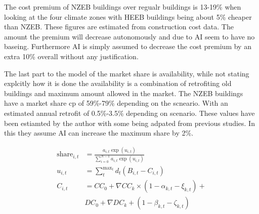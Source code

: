 \documentclass[conference,a4paper]{IEEEtran}
\begin{document}
The cost premium of NZEB buildings over regualr buildings is 13-19\% when looking at the four climate zones with HEEB buildings being about 5\% cheaper than NZEB. These figures are estimated from construction cost data. The amount the premium will decrease autonomously and due to AI seem to have no baseing. Furthermore AI is simply assumed to decrease the cost premium by an extra 10\% overall without any justification.

The last part to the model of the market share is availability, while not stating explcitly how it is done the availability is a combination of retrofiting old buildings and maximum amount allowed in the market. The NZEB buildings have a market share cp of 59\%-79\% depending on the scneario. With an estimated annual retrofit of 0.5\%-3.5\% depending on scenario. These values have been estiamted by the author with some being adpated from previous studies. In this they assume AI can increase the maximum share by 2\%.

\begin{align}
  \text{share}_{i,t} &= \frac{a_{i,t}\exp{(u_{i,t})}}{\sum_{i=0}^{N-1}a_{i,t}\exp{(u_{i,t})}}\label{eq:share} \\
  u_{i,t} &= \sum_{t}^{\text{max}_t}d_t(B_{i,t}-C_{i,t}) \label{eq:utility}\\
  C_{i,t} &= CC_0+ \nabla CC_k\times(1-\alpha_{k,t}-\xi_{k,t}) +\nonumber\\& DC_0+\nabla DC_k+(1-\beta_{k,t}-\zeta_{k,t}) \label{eq:cost}
\end{align}




\appendix
\end{document}
